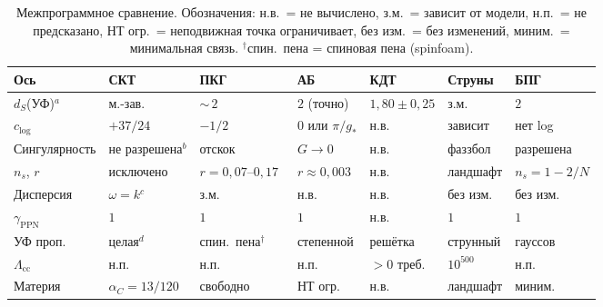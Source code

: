 \documentclass[12pt,a4paper]{article}
\theoremstyle{plain}
\theoremstyle{definition}
\theoremstyle{remark}
\begin{document}
\begin{table}[ht]
\centering
\caption{Межпрограммное сравнение. Обозначения: н.в.\ = не вычислено, з.м.\ = зависит от модели,
н.п.\ = не предсказано, НТ огр.\ = неподвижная точка
ограничивает, без изм.\ = без изменений, миним.\ = минимальная
связь. ${}^{\dagger}$спин.\ пена = спиновая пена (spinfoam).}
\label{tab:comparison}
\footnotesize
\setlength{\tabcolsep}{3pt}
\begin{tabular}{p{2.2cm}p{2.0cm}p{1.8cm}p{2.0cm}p{1.5cm}p{1.8cm}p{1.8cm}}
\toprule
Ось & СКТ & ПКГ & АБ & КДТ & Струны & БПГ \\
\midrule
$d_S$(УФ)${}^a$ &
  м.-зав. &
  ${\sim}\,2$ &
  $2$ (точно) &
  $1{,}80\pm0{,}25$ &
  з.м. &
  $2$ \\[4pt]
$c_{\log}$ &
  $+37/24$ &
  $-1/2$ &
  $0$ или $\pi/g_*$ &
  н.в. &
  зависит &
  нет log \\[4pt]
Сингулярность &
  не разрешена${}^b$ &
  отскок &
  $G \to 0$ &
  н.в. &
  фаззбол &
  разрешена \\[4pt]
$n_s$, $r$ &
  исключено &
  $r = 0{,}07$--$0{,}17$~\cite{AguloMorris:2015} &
  $r \approx 0{,}003$ &
  н.в. &
  ландшафт &
  $n_s = 1-2/N$ \\[4pt]
Дисперсия &
  $\omega = k$${}^c$ &
  з.м. &
  н.в. &
  н.в. &
  без изм. &
  без изм. \\[4pt]
$\gamma_{\text{PPN}}$ &
  $1$ &
  $1$ &
  $1$ &
  н.в. &
  $1$ &
  $1$ \\[4pt]
УФ проп. &
  целая${}^d$ &
  спин.\ пена${}^{\dagger}$ &
  степенной &
  решётка &
  струнный &
  гауссов \\[4pt]
$\Lambda_{\text{cc}}$ &
  н.п. &
  н.п. &
  н.п. &
  $>0$ треб. &
  $10^{500}$ &
  н.п. \\[4pt]
Материя &
  $\alpha_C = 13/120$ &
  свободно &
  НТ огр. &
  н.в. &
  ландшафт &
  миним. \\
\bottomrule
\end{tabular}

\smallskip{}
\end{table}
\end{document}
